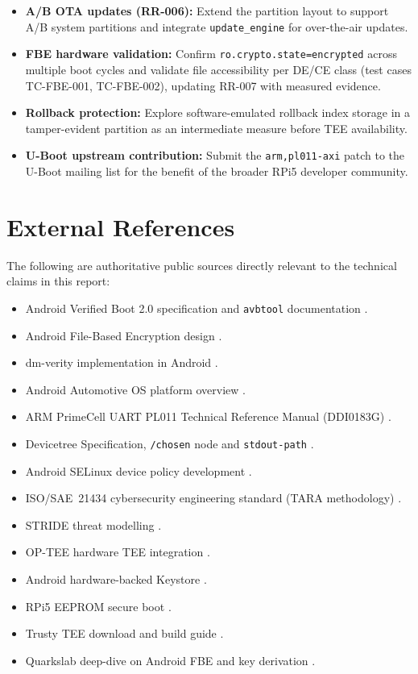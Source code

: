 \begin{itemize}
    \item \textbf{A/B OTA updates (RR-006):} Extend the partition layout to support A/B system partitions and integrate \texttt{update\_engine} for over-the-air updates.

    \item \textbf{FBE hardware validation:} Confirm \texttt{ro.crypto.state=encrypted} across multiple boot cycles and validate file accessibility per DE/CE class (test cases TC-FBE-001, TC-FBE-002), updating RR-007 with measured evidence.

    \item \textbf{Rollback protection:} Explore software-emulated rollback index storage in a tamper-evident partition as an intermediate measure before TEE availability.

    \item \textbf{U-Boot upstream contribution:} Submit the \texttt{arm,pl011-axi} patch to the U-Boot mailing list for the benefit of the broader RPi5 developer community.
\end{itemize}

\section{External References}

The following are authoritative public sources directly relevant to the technical claims in this report:

\begin{itemize}
    \item Android Verified Boot 2.0 specification and \texttt{avbtool} documentation \cite{avb2_readme}.
    \item Android File-Based Encryption design \cite{android_fbe}.
    \item dm-verity implementation in Android \cite{android_dm_verity}.
    \item Android Automotive OS platform overview \cite{aaos_overview}.
    \item ARM PrimeCell UART PL011 Technical Reference Manual (DDI0183G) \cite{arm_pl011_trm}.
    \item Devicetree Specification, \texttt{/chosen} node and \texttt{stdout-path} \cite{dt_spec_chosen}.
    \item Android SELinux device policy development \cite{selinux_device_policy}.
    \item ISO/SAE~21434 cybersecurity engineering standard (TARA methodology) \cite{iso_sae_21434}.
    \item STRIDE threat modelling \cite{stride_microsoft}.
    \item OP-TEE hardware TEE integration \cite{optee_project}.
    \item Android hardware-backed Keystore \cite{android_keystore_hw}.
    \item RPi5 EEPROM secure boot \cite{rpi5_eeprom_secure_boot}.
    \item Trusty TEE download and build guide \cite{trusty_download_build}.
    \item Quarkslab deep-dive on Android FBE and key derivation \cite{android_data_encryption}.
\end{itemize}

